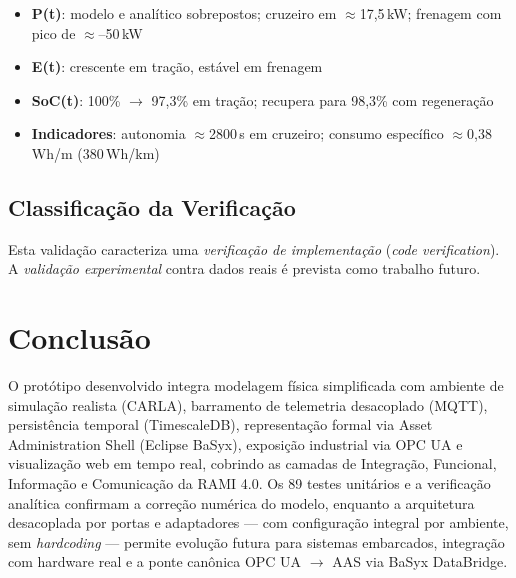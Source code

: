 \documentclass[12pt,a4paper]{report}
\begin{document}
\FloatBarrier

\begin{itemize}
    \item \textbf{P(t)}: modelo e analítico sobrepostos; cruzeiro em $\approx$17,5\,kW; frenagem com pico de $\approx$--50\,kW
    \item \textbf{E(t)}: crescente em tração, estável em frenagem
    \item \textbf{SoC(t)}: 100\% $\rightarrow$ 97,3\% em tração; recupera para 98,3\% com regeneração
    \item \textbf{Indicadores}: autonomia $\approx$2800\,s em cruzeiro; consumo específico $\approx$0,38\,Wh/m (380\,Wh/km)
\end{itemize}

\section{Classificação da Verificação}

Esta validação caracteriza uma \textit{verificação de implementação} (\textit{code verification}). A \textit{validação experimental} contra dados reais é prevista como trabalho futuro.

\chapter{Conclusão}

O protótipo desenvolvido integra modelagem física simplificada com ambiente de simulação realista (CARLA), barramento de telemetria desacoplado (MQTT), persistência temporal (TimescaleDB), representação formal via Asset Administration Shell (Eclipse BaSyx), exposição industrial via OPC UA e visualização web em tempo real, cobrindo as camadas de Integração, Funcional, Informação e Comunicação da RAMI 4.0. Os 89 testes unitários e a verificação analítica confirmam a correção numérica do modelo, enquanto a arquitetura desacoplada por portas e adaptadores --- com configuração integral por ambiente, sem \textit{hardcoding} --- permite evolução futura para sistemas embarcados, integração com hardware real e a ponte canônica OPC UA $\rightarrow$ AAS via BaSyx DataBridge.

\printbibliography
\end{document}
